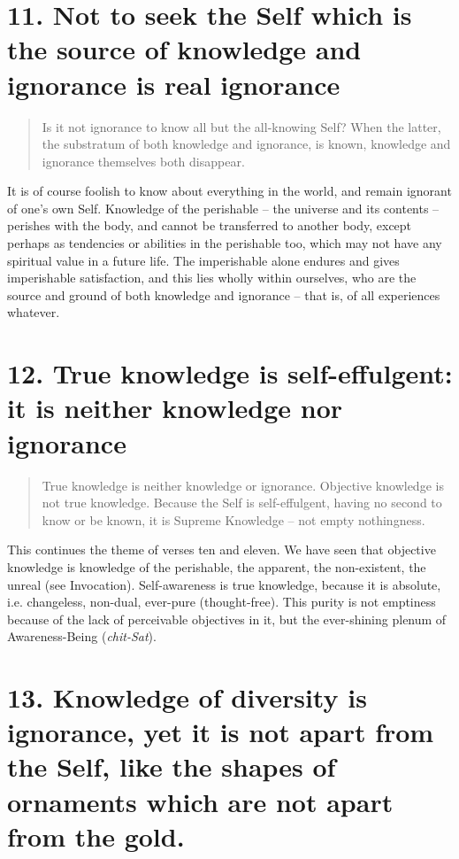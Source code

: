 \documentclass[12pt]{report}
\begin{document}
\section{11. Not to seek the Self which is the source of knowledge and
ignorance is real ignorance}

\begin{quote}
  Is it not ignorance to know all but the all-knowing Self? When the
  latter, the substratum of both knowledge and ignorance, is known,
  knowledge and ignorance themselves both disappear.
\end{quote}


It is of course foolish to know about everything in the world, and
remain ignorant of one's own Self. Knowledge of the perishable -- the
universe and its contents -- perishes with the body, and cannot be
transferred to another body, except perhaps as tendencies or abilities
in the perishable too, which may not have any spiritual value in a
future life. The imperishable alone endures and gives imperishable
satisfaction, and this lies wholly within ourselves, who are the
source and ground of both knowledge and ignorance -- that is, of all
experiences whatever.

\section{12. True knowledge is self-effulgent: it is neither knowledge
nor ignorance}

\begin{quote}
  True knowledge is neither knowledge or ignorance. Objective knowledge
  is not true knowledge. Because the Self is self-effulgent, having no
  second to know or be known, it is Supreme Knowledge -- not empty
  nothingness.
\end{quote}


This continues the theme of verses ten and eleven. We have seen that
objective knowledge is knowledge of the perishable, the apparent, the
non-existent, the unreal (see Invocation). Self-awareness is true
knowledge, because it is absolute, i.e. changeless, non-dual,
ever-pure (thought-free). This purity is not emptiness because of the
lack of perceivable objectives in it, but the ever-shining plenum of
Awareness-Being (\emph{chit-Sat}).

\section{13. Knowledge of diversity is ignorance, yet it is not apart
  from the Self, like the shapes of ornaments which are not apart from
the gold.}
\end{document}
